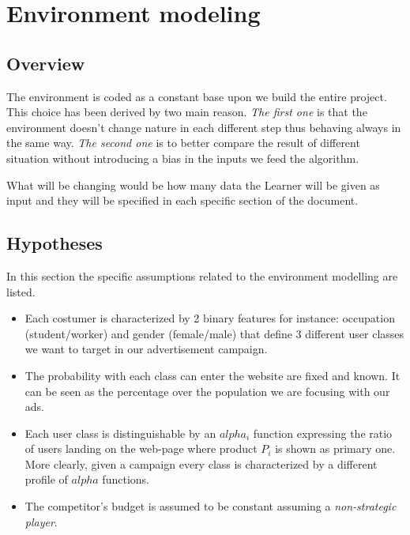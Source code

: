 \chapter{Environment modeling}
\label{chap:env_model}

\section{Overview}
\label{chap:env_overview}

The environment is coded as a constant base upon we build the entire project. This choice has been derived by two main reason. \textit{The first one} is that the environment doesn't change nature in each different step thus behaving always in the same way. \textit{The second one} is to better compare the result of different situation without introducing a bias in the inputs we feed the algorithm.

What will be changing would be how many data the Learner will be given as input and they will be specified in each specific section of the document.

\section{Hypotheses}
 \label{sec:env_hypoteses}

In this section the specific assumptions related to the environment modelling are listed.

\begin{itemize}
    \item Each costumer is characterized by 2 binary features for instance: occupation (student/worker) and gender (female/male) that define 3 different user classes we want to target in our advertisement campaign.
    \item The probability with each class can enter the website are fixed and known. It can be seen as the percentage over the population we are focusing with our ads.
    \item Each user class is distinguishable by an $alpha_i$ function expressing the ratio of users landing on the web-page where product $P_i$ is shown as primary one. More clearly, given a campaign every class is characterized by a different profile of $alpha$ functions.
    \item The competitor's budget is assumed to be constant assuming a \textit{non-strategic player}.
 \end{itemize}

